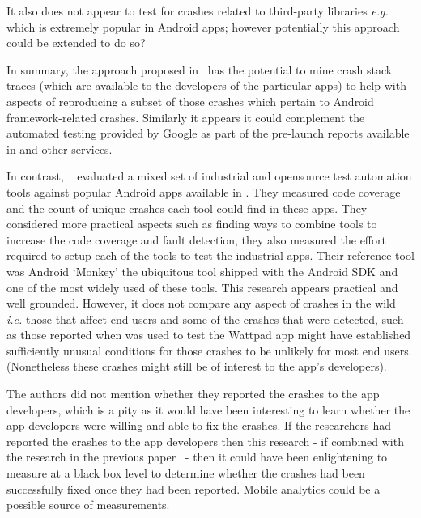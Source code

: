 It also does not appear to test for crashes related to third-party libraries \emph{e.g.}~ which is extremely popular in Android apps; however potentially this approach could be extended to do so?

In summary, the approach proposed in~ has the potential to mine crash stack traces (which are available to the developers of the particular apps) to help with aspects of reproducing a subset of those crashes which pertain to Android framework-related crashes. Similarly it appears it could complement the automated testing provided by Google as part of the pre-launch reports available in  and other services. 

In contrast, ~ evaluated a mixed set of industrial and opensource test automation tools against popular Android apps available in . They measured code coverage and the count of unique crashes each tool could find in these apps. They considered more practical aspects such as finding ways to combine tools to increase the code coverage and fault detection, they also measured the effort required to setup each of the tools to test the industrial apps. Their reference tool was Android `Monkey' the ubiquitous tool shipped with the Android SDK and one of the most widely used of these tools. This research appears practical and well grounded. However, it does not compare any aspect of crashes in the wild \emph{i.e.} those that affect end users and some of the crashes that were detected, such as those reported when  was used to test the Wattpad app might have established sufficiently unusual conditions for those crashes to be unlikely for most end users. (Nonetheless these crashes might still be of interest to the app's developers). 

The authors did not mention whether they reported the crashes to the app developers, which is a pity as it would have been interesting to learn whether the app developers were willing and able to fix the crashes. If the researchers had reported the crashes to the app developers then this research - if combined with the research in the previous paper~ - then it could have been enlightening to measure at a black box level to determine whether the crashes had been successfully fixed once they had been reported. Mobile analytics could be a possible source of measurements.

